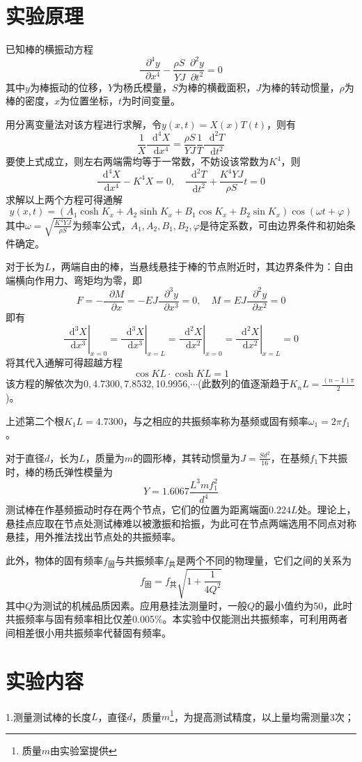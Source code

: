 \documentclass[UTF-8,twoside,cs4size]{ctexart}
\newcommand*{\mpar}{\mathop{}\!\partial}
\newcommand*{\dif}{\mathop{}\!\mathrm{d}}
\begin{document}
	\section{实验原理}
	已知棒的横振动方程
	\[\frac{\mpar^4y}{\mpar x^4}-\frac{\rho S\mpar^2y}{YJ\mpar t^2}=0\]
	其中$ y $为棒振动的位移，$ Y $为杨氏模量，$ S $为棒的横截面积，$ J $为棒的转动惯量，$ \rho $为棒的密度，$ x $为位置坐标，$ t $为时间变量。
	
	用分离变量法对该方程进行求解，令$ y(x,t)=X(x)T(t) $，则有
	\[\frac1X\frac{\dif^4X}{\dif x^4}=\frac{\rho S}{YJ}\frac1T\frac{\dif^2T}{\dif t^2}\]
	要使上式成立，则左右两端需均等于一常数，不妨设该常数为$ K^4 $，则
	\[\frac{\dif^4X}{\dif x^4}-K^4X=0,\quad\frac{\dif^2 T}{\dif t^2}+\frac{K^4YJ}{\rho S}t=0\]
	求解以上两个方程可得通解
	\[y(x,t)=(A_1\cosh K_x+A_2\sinh K_x+B_1\cos K_x+B_2\sin K_x)\cos(\omega t+\varphi)\]
	其中$ \omega=\sqrt{\frac{K^4YJ}{\rho S}} $为频率公式，$ A_1,A_2,B_1,B_2,\varphi $是待定系数，可由边界条件和初始条件确定。
	
	对于长为$ L $，两端自由的棒，当悬线悬挂于棒的节点附近时，其边界条件为：自由端横向作用力、弯矩均为零，即
	\[F=-\frac{\mpar M}{\mpar x}=-EJ\frac{\mpar^3y}{\mpar x^3}=0,\quad M=EJ\frac{\mpar^2y}{\mpar x^2}=0\]
	即有
	\[\left.\frac{\dif^3X}{\dif x^3}\right|_{x=0}=\left.\frac{\dif^3X}{\dif x^3}\right|_{x=L}=\left.\frac{\dif^2X}{\dif x^2}\right|_{x=0}=\left.\frac{\dif^2X}{\dif x^2}\right|_{x=L}=0\]
	将其代入通解可得超越方程
	\[\cos KL\cdot\cosh KL=1\]
	该方程的解依次为0,\,4.7300,\,7.8532,\,10.9956,$\cdots$(此数列的值逐渐趋于$ K_nL=\frac{(n-1)\pi}{2} $)。
	
	上述第二个根$ K_1L=4.7300 $，与之相应的共振频率称为基频或固有频率$ \omega_1=2\pi f_1 $。
	
	对于直径$ d $，长为$ L $，质量为$ m $的圆形棒，其转动惯量为$ J=\frac{Sd^2}{16} $，在基频$ f_1 $下共振时，棒的杨氏弹性模量为
	\[Y=1.6067\frac{L^3mf_1^2}{d^4}\]
	测试棒在作基频振动时存在两个节点，它们的位置为距离端面$ 0.224L $处。理论上，悬挂点应取在节点处测试棒难以被激振和拾振，为此可在节点两端选用不同点对称悬挂，用外推法找出节点处的共振频率。
	
	此外，物体的固有频率$ f_{\text{固}} $与共振频率$ f_{\text{共}} $是两个不同的物理量，它们之间的关系为
	\[f_{\text{固}}=f_{\text{共}}\sqrt{1+\frac{1}{4Q^2}}\]
	其中$ Q $为测试的机械品质因素。应用悬挂法测量时，一般$ Q $的最小值约为50，此时共振频率与固有频率相比仅差0.005\%。本实验中仅能测出共振频率，可利用两者间相差很小用共振频率代替固有频率。
	
	\section{实验内容}
	1.测量测试棒的长度$ L $，直径$ d $，质量$ m $\footnote{质量$ m $由实验室提供}，为提高测试精度，以上量均需测量3次；
	
\end{document}
